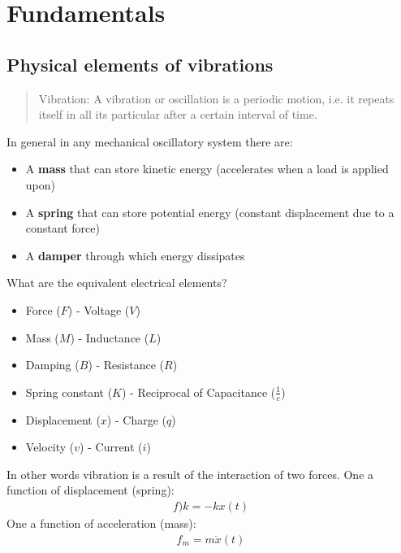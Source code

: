 \section{Fundamentals}
\subsection{Physical elements of vibrations}
\begin{quotation}
    Vibration: A vibration or oscillation is a periodic motion, i.e. it repeats itself in all its particular after a certain interval of time.
\end{quotation}
In general in any mechanical oscillatory system there are:
\begin{itemize}
    \item A \textbf{mass} that can store kinetic energy (accelerates when a load is applied upon)
    \item A \textbf{spring} that can store potential energy (constant displacement due to a constant force)
    \item A \textbf{damper} through which energy dissipates
\end{itemize}
What are the equivalent electrical elements?
\begin{itemize}
    \item Force ($F$) - Voltage ($V$)
    \item Mass ($M$) - Inductance ($L$)
    \item Damping ($B$) - Resistance ($R$)
    \item Spring constant ($K$) - Reciprocal of Capacitance ($\frac{1}{c}$)
    \item Displacement ($x$) - Charge ($q$)
    \item Velocity ($v$) - Current ($i$)
\end{itemize}
In other words vibration is a result of the interaction of two forces. One a function of displacement (spring):
\begin{gather}
    f)k = - kx(t)
\end{gather}
One a function of acceleration (mass):
\begin{gather}
    f_m = m \ddot{x} (t)
\end{gather}
